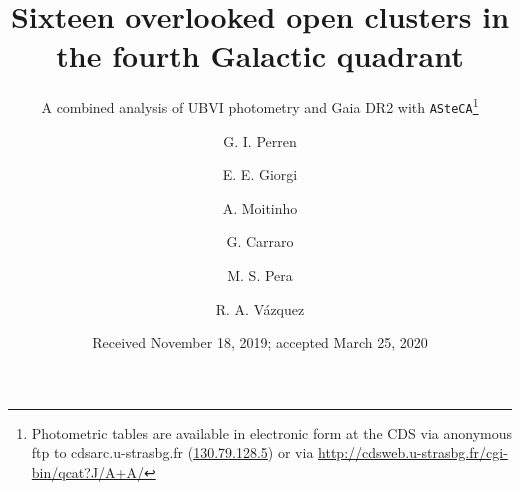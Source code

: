 \documentclass[draft]{aa}
\begin{document}
\title{Sixteen overlooked open clusters in the fourth Galactic quadrant}
\subtitle{A combined analysis of UBVI photometry and Gaia DR2 with 
\texttt{ASteCA}\thanks{
Photometric tables are available in electronic form
at the CDS via anonymous ftp to cdsarc.u-strasbg.fr (\url{130.79.128.5})
or via \url{http://cdsweb.u-strasbg.fr/cgi-bin/qcat?J/A+A/}}}

\author{G. I. Perren
      \and
      E. E. Giorgi
      \and
      A. Moitinho
      \and
      G. Carraro
      \and
      M. S. Pera
      \and
      R. A. Vázquez
}


\date{Received November 18, 2019; accepted March 25, 2020}
\end{document}

